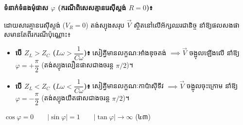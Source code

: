 \vspace{0.5em}
\noindent
\textbf{ទំនាក់ទំនងមុំផាស $\varphi$ (ករណីពិសេសគ្មានរេស៊ីស្តង់ $R = 0$)៖}

ដោយសារគ្មានរេស៊ីស្តង់ ($V_R = 0$) តង់ស្យុងសរុប $\vec{V}$ ស្ថិតនៅលើអ័ក្សឈរជានិច្ច នាំឱ្យផលសងផាសមានតែពីរករណីប៉ុណ្ណោះ៖
\begin{itemize}[itemsep=3pt, topsep=2pt, leftmargin=1.6em]
	\item \textbf{បើ $Z_L > Z_C$ ($L\omega > \dfrac{1}{C\omega}$)៖} សៀគ្វីមានលក្ខណៈអាំងឌុចតង់ $\implies \vec{V}$ ចង្អុលឡើងលើ នាំឱ្យ $\boxed{\varphi = +\dfrac{\pi}{2}}$ (តង់ស្យុងលឿនផាសជាងចរន្ត $\pi/2$)។
	\item \textbf{បើ $Z_L < Z_C$ ($L\omega < \dfrac{1}{C\omega}$)៖} សៀគ្វីមានលក្ខណៈកាប៉ាស៊ីទីវ $\implies \vec{V}$ ចង្អុលចុះក្រោម នាំឱ្យ $\boxed{\varphi = -\dfrac{\pi}{2}}$ (តង់ស្យុងយឺតផាសជាងចរន្ត $\pi/2$)។
\end{itemize}

\begin{center}
	$\boxed{\cos\varphi = 0} \qquad \boxed{|\sin\varphi| = 1} \qquad \boxed{|\tan\varphi| \to \infty}$ \quad (៤៣)
\end{center}

\vspace{0.3em}


